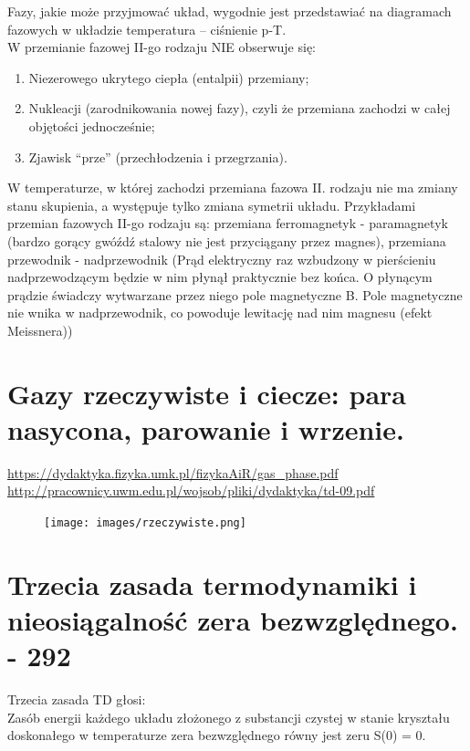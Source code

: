 \documentclass{article}
\begin{document}
Fazy, jakie może przyjmować układ, wygodnie jest przedstawiać na diagramach fazowych w układzie temperatura – ciśnienie p-T. \\

W przemianie fazowej II-go rodzaju NIE obserwuje się:
\begin{enumerate}
    \item Niezerowego ukrytego ciepła (entalpii) przemiany;
    \item Nukleacji (zarodnikowania nowej fazy), czyli że przemiana zachodzi w całej objętości jednocześnie;
    \item Zjawisk “prze” (przechłodzenia i przegrzania).
\end{enumerate}
W temperaturze, w której zachodzi przemiana fazowa II. rodzaju  nie ma zmiany stanu skupienia, a występuje tylko zmiana symetrii układu. Przykładami przemian fazowych II-go rodzaju są: przemiana ferromagnetyk - paramagnetyk (bardzo gorący gwóźdź stalowy nie jest przyciągany przez magnes), przemiana przewodnik - nadprzewodnik (Prąd elektryczny raz wzbudzony w pierścieniu nadprzewodzącym będzie w nim płynął praktycznie bez końca. O płynącym prądzie świadczy wytwarzane przez niego pole magnetyczne B. Pole magnetyczne nie wnika w nadprzewodnik, co powoduje lewitację nad nim magnesu (efekt Meissnera))

 
\section{Gazy rzeczywiste i ciecze: para nasycona, parowanie i wrzenie.}
\url{https://dydaktyka.fizyka.umk.pl/fizykaAiR/gas_phase.pdf}\\
\url{http://pracownicy.uwm.edu.pl/wojsob/pliki/dydaktyka/td-09.pdf}

\begin{figure}[H]
    \centering
    \texttt{[image: images/rzeczywiste.png]}
\end{figure}

\section{Trzecia zasada termodynamiki i nieosiągalność zera bezwzględnego. - 292}

Trzecia zasada TD głosi: \\
Zasób energii każdego układu złożonego z substancji czystej w stanie kryształu doskonałego w temperaturze zera bezwzględnego równy jest zeru S(0) = 0.\\
\end{document}
